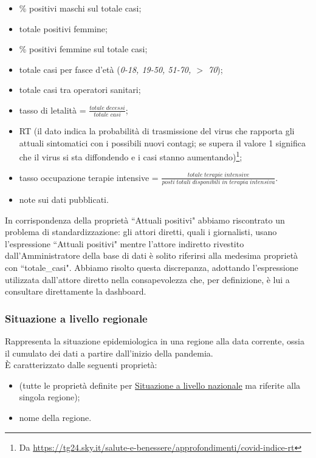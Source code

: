 \begin{itemize}
    \item \% positivi maschi sul totale casi;
    \item totale positivi femmine;
    \item \% positivi femmine sul totale casi;
    \item totale casi per fasce d'età (\textit{0-18, 19-50, 51-70, $>$ 70});
    \item totale casi tra operatori sanitari;
    \item tasso di letalità = $\frac{totale \; decessi}{totale \; casi}$;
    \item RT (il dato indica la probabilità di trasmissione del virus che rapporta gli attuali sintomatici con i possibili nuovi contagi; se supera il valore 1 significa che il virus si sta diffondendo e i casi stanno aumentando)\footnote{Da \href{https://tg24.sky.it/salute-e-benessere/approfondimenti/covid-indice-rt}{https://tg24.sky.it/salute-e-benessere/approfondimenti/covid-indice-rt}};
    \item tasso occupazione terapie intensive = $\frac{totale \; terapie \; intensive}{posti \; totali \; disponibili \; in \; terapia \; intensiva}$.
    \item note sui dati pubblicati.
\end{itemize}
In corrispondenza della proprietà ``Attuali positivi" abbiamo riscontrato un problema di standardizzazione: gli attori diretti, quali i giornalisti, usano l'espressione ``Attuali positivi" mentre l'attore indiretto rivestito dall'Amministratore della base di dati è solito riferirsi alla medesima proprietà con ``totale\_casi". Abbiamo risolto questa discrepanza, adottando l'espressione utilizzata dall'attore diretto nella consapevolezza che, per definizione, è lui a consultare direttamente la dashboard.

\subsubsection{Situazione a livello regionale}
\label{sss:situazione-livello-regionale}
Rappresenta la situazione epidemiologica in una regione alla data corrente, ossia il cumulato dei dati a partire dall'inizio della pandemia.\\
È caratterizzato dalle seguenti proprietà:
\begin{itemize}
    \item (tutte le proprietà definite per \hyperref[sss:situazione-livello-nazionale]{Situazione a livello nazionale} ma riferite alla singola regione);
    \item nome della regione.
\end{itemize}

